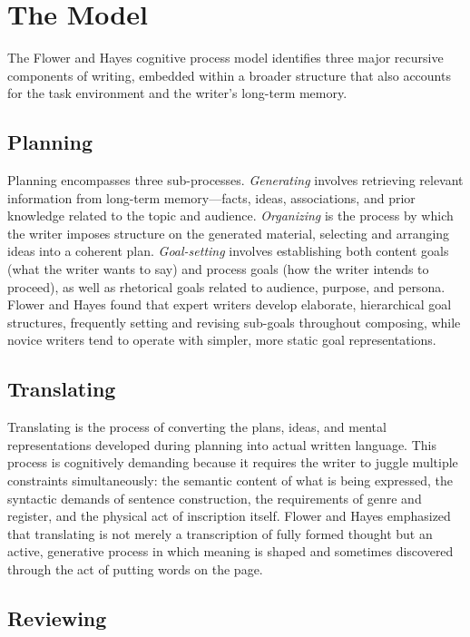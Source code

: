 \documentclass[12pt]{article}
\begin{document}
\section{The Model}

The Flower and Hayes cognitive process model identifies three major recursive components of writing, embedded within a broader structure that also accounts for the task environment and the writer's long-term memory.

\subsection{Planning}

Planning encompasses three sub-processes. \textit{Generating} involves retrieving relevant information from long-term memory---facts, ideas, associations, and prior knowledge related to the topic and audience. \textit{Organizing} is the process by which the writer imposes structure on the generated material, selecting and arranging ideas into a coherent plan. \textit{Goal-setting} involves establishing both content goals (what the writer wants to say) and process goals (how the writer intends to proceed), as well as rhetorical goals related to audience, purpose, and persona. Flower and Hayes found that expert writers develop elaborate, hierarchical goal structures, frequently setting and revising sub-goals throughout composing, while novice writers tend to operate with simpler, more static goal representations.

\subsection{Translating}

Translating is the process of converting the plans, ideas, and mental representations developed during planning into actual written language. This process is cognitively demanding because it requires the writer to juggle multiple constraints simultaneously: the semantic content of what is being expressed, the syntactic demands of sentence construction, the requirements of genre and register, and the physical act of inscription itself. Flower and Hayes emphasized that translating is not merely a transcription of fully formed thought but an active, generative process in which meaning is shaped and sometimes discovered through the act of putting words on the page.

\subsection{Reviewing}
\end{document}
